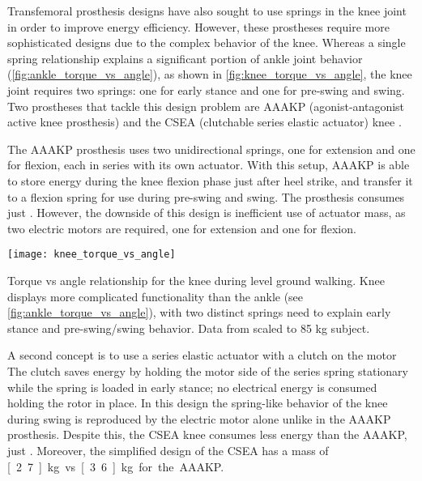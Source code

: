 Transfemoral prosthesis designs have also sought to use springs in the knee
joint in order to improve energy efficiency. However, these prostheses require
more sophisticated designs due to the complex behavior of the knee. Whereas a
single spring relationship explains a significant portion of ankle joint
behavior (\cref{fig:ankle_torque_vs_angle}), as shown in
\cref{fig:knee_torque_vs_angle}, the knee joint requires two springs: one for
early stance and one for pre-swing and swing. Two prostheses that tackle this
design problem are AAAKP (agonist-antagonist active knee prosthesis)
\citep{martinez2008design, martinez2011antagonistic} and the CSEA (clutchable
series elastic actuator) knee \citep{rouse2014clutchable, rouse2015design}.

The AAAKP prosthesis uses two unidirectional springs, one for extension and one
for flexion, each in series with its own actuator. With this setup,
AAAKP is able to store energy during the knee flexion phase just after heel
strike, and transfer it to a flexion spring for use during pre-swing and swing.
The prosthesis consumes just . However, the downside of
this design is inefficient use of actuator mass, as two electric motors are
required, one for extension and one for flexion.

\begin{marginfigure}[0in]
    \centering
    \texttt{[image: knee\_torque\_vs\_angle]}
    \caption{Torque vs angle relationship for the knee during level ground
    walking. Knee displays more complicated functionality than the ankle (see
    \cref{fig:ankle_torque_vs_angle}), with two distinct springs need to explain
    early stance and pre-swing/swing behavior. Data from
    \citet{winter2009biomechanics} scaled to 85 kg subject.}
    \label{fig:knee_torque_vs_angle}
\end{marginfigure}
A second concept is to use a series elastic actuator with a clutch on the motor
\citep{rouse2014clutchable, rouse2015design} The clutch saves energy by holding
the motor side of the series spring stationary while the spring is loaded in
early stance; no electrical energy is consumed holding the rotor in place. In
this design the spring-like behavior of the knee during swing is reproduced by
the electric motor alone unlike in the AAAKP prosthesis. Despite this, the
CSEA knee consumes less energy than the AAAKP, just .
Moreover, the simplified design of the CSEA has a mass of \unit[2.7]{kg} vs
\unit[3.6]{kg} for the AAAKP.

